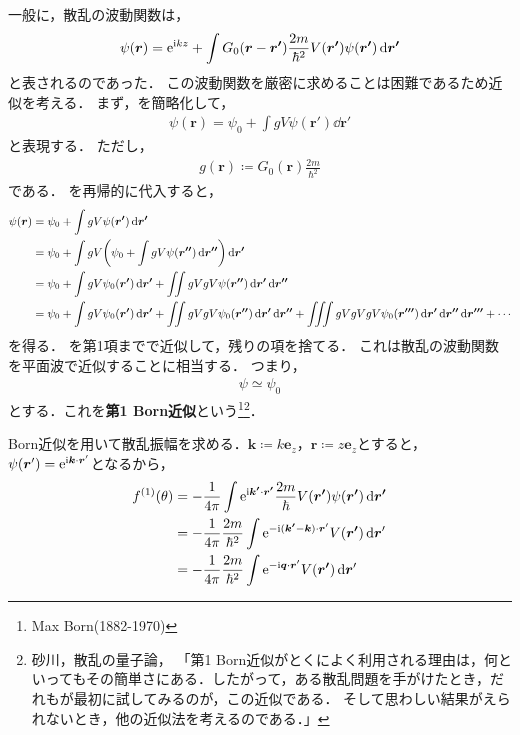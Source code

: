 \documentclass{report}
\begin{document}
  一般に，散乱の波動関数は，
  \begin{align}
    \psi(\bm{r}) = \mathrm{e}^{\mathrm{i} kz} + \int G_0 (\bm{r} - \bm{r'}) \frac{2m}{\hbar^2} V(\bm{r'}) \psi(\bm{r'}) \dd{\bm{r'}}\label{wave-funtion-of-scattering}
  \end{align}
  と表されるのであった．
  この波動関数を厳密に求めることは困難であるため近似を考える．
  まず，を簡略化して，
  \begin{align}
    \psi(\bm{r}) = \psi_0 + \int g V \psi(\bm{r}') \dd{\bm{r}'}\label{simple-wave-funtion-of-scattering}
  \end{align}
  と表現する．
  ただし，
  \begin{align}
    g(\bm{r}) \coloneqq G_0(\bm{r})\frac{2m}{\hbar^2}
  \end{align}
  である．
  を再帰的に代入すると，
  \begin{align}
    \psi(\bm{r}) &= \psi_0 + \int g V \psi(\bm{r'}) \dd{\bm{r'}} \\
    &= \psi_0 + \int gV \qty(\psi_0 + \int g V \psi(\bm{r''}) \dd{\bm{r''}}) \dd{\bm{r'}} \\
    &= \psi_0 + \int g V \psi_0(\bm{r'}) \dd{\bm{r'}} + \iint gVgV \psi(\bm{r''}) \dd{\bm{r'}} \dd{\bm{r''}} \\
    &= \psi_0 + \int g V \psi_0(\bm{r'}) \dd{\bm{r'}} + \iint gVgV \psi_0(\bm{r''}) \dd{\bm{r'}} \dd{\bm{r''}} + \iiint gVgVgV \psi_0(\bm{r'''}) \dd{\bm{r'}} \dd{\bm{r''}} \dd{\bm{r'''}} + \cdots\label{dozens-of-gv}
  \end{align}
  を得る．
  を第1項までで近似して，残りの項を捨てる．
  これは散乱の波動関数を平面波で近似することに相当する．
  つまり，
  \begin{align}
    \psi \simeq \psi_0
  \end{align}
  とする．これを\textbf{第1 Born近似}という\footnote{Max Born(1882-1970)}\footnote{砂川，散乱の量子論，
  「第1 Born近似がとくによく利用される理由は，何といってもその簡単さにある．したがって，ある散乱問題を手がけたとき，だれもが最初に試してみるのが，この近似である．
  そして思わしい結果がえられないとき，他の近似法を考えるのである．」}．
  \par
  Born近似を用いて散乱振幅を求める．$\bm{k} \coloneqq k\bm{e}_z$，$\bm{r} \coloneqq z\bm{e}_z$とすると，
  $\psi(\bm{r}') = \mathrm{e}^{\mathrm{i} \bm{k}\cdot\bm{r}'}$となるから，
  \begin{align}
    f^{(1)}(\theta) &= -\frac{1}{4\pi} \int \mathrm{e}^{\mathrm{i} \bm{k'}\cdot\bm{r'}} \frac{2m}{\hbar} V(\bm{r'}) \psi(\bm{r'}) \dd{\bm{r'}} \\
    &= -\frac{1}{4\pi}\frac{2m}{\hbar^2}\int\mathrm{e}^{-\mathrm{i} (\bm{k'} - \bm{k})\cdot\bm{r}'} V(\bm{r'}) \dd{\bm{r}'} \\
    &= -\frac{1}{4\pi}\frac{2m}{\hbar^2}\int\mathrm{e}^{-\mathrm{i} \bm{q} \cdot \bm{r}'} V(\bm{r'}) \dd{\bm{r}'}\label{potential-fourier-transform}
  \end{align}
\end{document}
